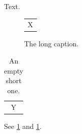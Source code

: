 \documentclass{article}
\begin{document}
Text.
\begin{figure}[h]
\centering
\begin{tabular}{c}X\end{tabular}
\caption[Short]{The long caption.}
\label{fig:a}
\end{figure}
\begin{table}[h]
\caption[]{An empty short one.}
\label{tab:a}
\begin{tabular}{c}Y\end{tabular}
\end{table}
See \ref{fig:a} and \ref{tab:a}.
\end{document}
